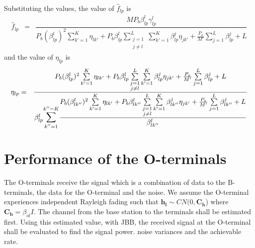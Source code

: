 \documentclass[10pt, a4paper, twoside,fleqn]{article}
\begin{document}
Substituting the values, the value of $\hat f_{lp}$ is
\begin{eqnarray}
	\hat f_{lp} &=& \dfrac{MP_b\beta_{lp}^{l}\gamma_{lp}^{l}}
                            {P_b(\beta_{lp}^{l})^2\sum\limits_{k' = 1}^{K}\eta_{lk'}
                            +P_b\beta_{lp}^{l} \sum\limits_{\substack{j=1 \\ j \neq l}}^{L} \sum\limits_{k' = 1}^{K}\beta^{j}_{lp}\eta_{jk'}
		  	    +\frac{P_o}{M'} \sum\limits_{j=1}^{L}\beta_{lp}^{j}
						   +L}
\end{eqnarray}
and the value of $\eta_{lp}$ is
\begin{eqnarray}
	\eta_{lp} &=&  \dfrac{P_b(\beta_{lp}^{l})^2\sum\limits_{k' = 1}^{K}\eta_{lk'}
                            +P_b\beta_{lp}^{l} \sum\limits_{\substack{j=1 \\ j \neq l}}^{L} \sum\limits_{k' = 1}^{K}\beta^{j}_{lp}\eta_{jk'}
		  	    +\frac{P_o}{M'} \sum\limits_{j=1}^{L}\beta_{lp}^{j}+L}
			     {\beta_{lp}^{l}\mathlarger{\mathlarger{\sum}}\limits_{k''=1}^{k''=K}\dfrac{
                            P_b(\beta_{lk''}^{l})^2\sum\limits_{k' = 1}^{K}\eta_{lk'}
                            +P_b\beta_{lk''}^{l} \sum\limits_{\substack{j=1 \\ j \neq l}}^{L} \sum\limits_{k' = 1}^{K}\beta^{j}_{lk''}\eta_{jk'}
		  	    +\frac{P_o}{M'} \sum\limits_{j=1}^{L}\beta_{lk''}^{j}
						   +L}{\beta_{lk''}^{l}}}
\end{eqnarray}

\section{Performance of the O-terminals}
	The O-terminals receive the signal which is a combination of data to the B-terminals, the data for the O-terminal and the noise. We assume the O-terminal experiences independent Rayleigh fading such that $\mathbf{h_{l}} \sim CN(0,\mathbf{C_h}$) where $\mathbf{C_h} = \beta_{ol}I$. The channel from the base station to the terminals shall be estimated first. Using this estimated value, with JBB, the received signal at the O-terminal shall be evaluated to find the signal power. noise variances and the achievable rate.
\end{document}
